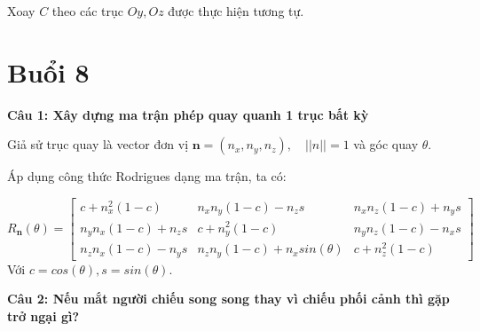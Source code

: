 Xoay $C$ theo các trục $Oy, Oz$ được thực hiện tương tự. 

\section{Buổi 8}
\textbf{Câu 1: Xây dựng ma trận phép quay quanh 1 trục bất kỳ}

Giả sử trục quay là vector đơn vị $\textbf{n} = (n_x, n_y, n_z), \quad ||n|| = 1$ và góc quay $\theta$.

Áp dụng công thức Rodrigues dạng ma trận, ta có:

$R_\textbf{n}(\theta) =
\begin{bmatrix}
c + n_x^2 (1 - c) & n_x n_y (1-c) - n_z s & n_x n_z (1-c) + n_y s \\
n_y n_x (1-c) + n_z s & c + n_y^2 (1 - c) & n_y n_z (1 - c) - n_x s \\
n_z n_x (1 - c) - n_y s & n_z n_y (1 - c) + n_x sin(\theta) & c + n_z^2 (1 - c)
\end{bmatrix}
$
Với $c = cos(\theta), s = sin(\theta)$.

\textbf{Câu 2: Nếu mắt người chiếu song song thay vì chiếu phối cảnh thì gặp trở ngại gì?}

